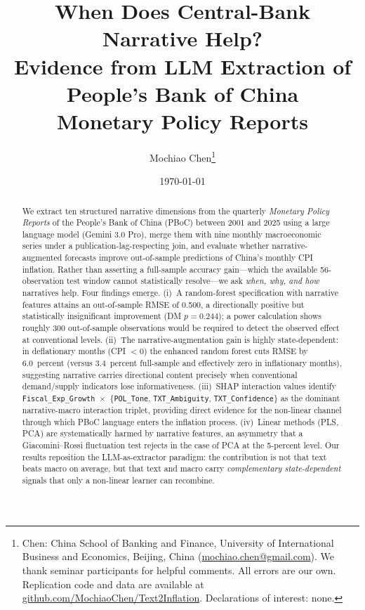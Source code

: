 \documentclass[AER]{AEA}
\begin{document}
\title{When Does Central-Bank Narrative Help? \\
  Evidence from LLM Extraction of People's Bank of China \\
  Monetary Policy Reports}
\author{Mochiao Chen\thanks{Chen: China School of Banking and Finance,
University of International Business and Economics, Beijing, China
(\href{mailto:mochiao.chen@gmail.com}{mochiao.chen@gmail.com}).
We thank seminar participants for helpful comments. All errors are our own.
Replication code and data are available at
\href{https://github.com/MochiaoChen/Text2Inflation}{github.com/MochiaoChen/Text2Inflation}.
Declarations of interest: none.}}
\date{\today}

\begin{abstract}
We extract ten structured narrative dimensions from the quarterly
\emph{Monetary Policy Reports} of the People's Bank of China (PBoC) between
2001 and 2025 using a large language model (Gemini 3.0 Pro), merge them with
nine monthly macroeconomic series under a publication-lag-respecting join,
and evaluate whether narrative-augmented forecasts improve out-of-sample
predictions of China's monthly CPI inflation. Rather than asserting a
full-sample accuracy gain---which the available 56-observation test window
cannot statistically resolve---we ask \emph{when, why, and how} narratives
help. Four findings emerge. (i)~A random-forest specification with narrative
features attains an out-of-sample RMSE of \num{0.500}, a directionally
positive but statistically insignificant improvement (DM $p=0.244$); a
power calculation shows roughly $300$ out-of-sample observations would be
required to detect the observed effect at conventional levels. (ii)~The
narrative-augmentation gain is highly state-dependent: in deflationary
months (CPI $<0$) the enhanced random forest cuts RMSE by 6.0~percent
(versus 3.4~percent full-sample and effectively zero in inflationary months),
suggesting narrative carries directional content precisely when conventional
demand/supply indicators lose informativeness. (iii)~SHAP interaction values
identify \texttt{Fiscal\_Exp\_Growth}~$\times$~\{\texttt{POL\_Tone},
\texttt{TXT\_Ambiguity}, \texttt{TXT\_Confidence}\} as the dominant
narrative-macro interaction triplet, providing direct evidence for the
non-linear channel through which PBoC language enters the inflation process.
(iv)~Linear methods (PLS, PCA) are systematically harmed by narrative
features, an asymmetry that a Giacomini--Rossi fluctuation test rejects in
the case of PCA at the 5-percent level. Our results reposition the
LLM-as-extractor paradigm: the contribution is not that text beats macro on
average, but that text and macro carry \emph{complementary state-dependent}
signals that only a non-linear learner can recombine.
\end{abstract}
\end{document}
